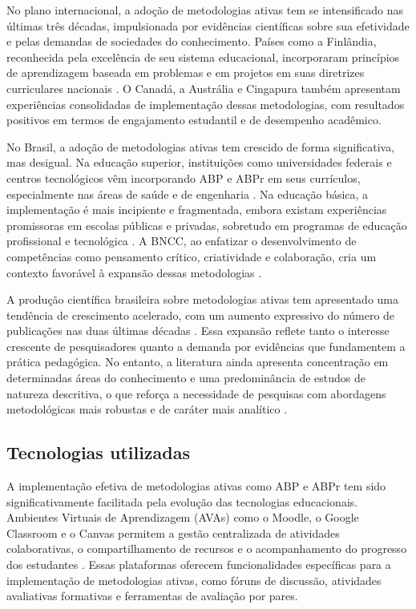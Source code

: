 No plano internacional, a adoção de metodologias ativas tem se intensificado nas últimas três décadas, impulsionada por evidências científicas sobre sua efetividade e pelas demandas de sociedades do conhecimento. Países como a Finlândia, reconhecida pela excelência de seu sistema educacional, incorporaram princípios de aprendizagem baseada em problemas e em projetos em suas diretrizes curriculares nacionais \cite{BONWELL1991}. O Canadá, a Austrália e Cingapura também apresentam experiências consolidadas de implementação dessas metodologias, com resultados positivos em termos de engajamento estudantil e de desempenho acadêmico.

No Brasil, a adoção de metodologias ativas tem crescido de forma significativa, mas desigual. Na educação superior, instituições como universidades federais e centros tecnológicos vêm incorporando ABP e ABPr em seus currículos, especialmente nas áreas de saúde e de engenharia \cite{GOMES2009}. Na educação básica, a implementação é mais incipiente e fragmentada, embora existam experiências promissoras em escolas públicas e privadas, sobretudo em programas de educação profissional e tecnológica \cite{TEODORO2024}. A BNCC, ao enfatizar o desenvolvimento de competências como pensamento crítico, criatividade e colaboração, cria um contexto favorável à expansão dessas metodologias \cite{BRASIL2018}.

A produção científica brasileira sobre metodologias ativas tem apresentado uma tendência de crescimento acelerado, com um aumento expressivo do número de publicações nas duas últimas décadas \cite{SANTOS2024}. Essa expansão reflete tanto o interesse crescente de pesquisadores quanto a demanda por evidências que fundamentem a prática pedagógica. No entanto, a literatura ainda apresenta concentração em determinadas áreas do conhecimento e uma predominância de estudos de natureza descritiva, o que reforça a necessidade de pesquisas com abordagens metodológicas mais robustas e de caráter mais analítico \cite{RIBEIRO2025}.

\subsection{Tecnologias utilizadas}
\label{subsec:tecno_utilizadas}

A implementação efetiva de metodologias ativas como ABP e ABPr tem sido significativamente facilitada pela evolução das tecnologias educacionais. Ambientes Virtuais de Aprendizagem (AVAs) como o Moodle, o Google Classroom e o Canvas permitem a gestão centralizada de atividades colaborativas, o compartilhamento de recursos e o acompanhamento do progresso dos estudantes \cite{MEZZARI2011}. Essas plataformas oferecem funcionalidades específicas para a implementação de metodologias ativas, como fóruns de discussão, atividades avaliativas formativas e ferramentas de avaliação por pares.

